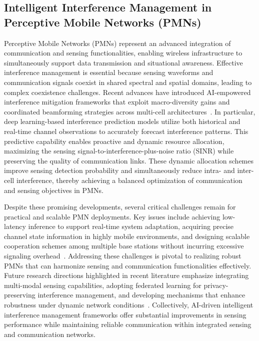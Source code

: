 \documentclass[sigconf]{acmart}
\begin{document}
\subsection{Intelligent Interference Management in Perceptive Mobile Networks (PMNs)}

Perceptive Mobile Networks (PMNs) represent an advanced integration of communication and sensing functionalities, enabling wireless infrastructure to simultaneously support data transmission and situational awareness. Effective interference management is essential because sensing waveforms and communication signals coexist in shared spectral and spatial domains, leading to complex coexistence challenges. Recent advances have introduced AI-empowered interference mitigation frameworks that exploit macro-diversity gains and coordinated beamforming strategies across multi-cell architectures~\cite{ref48}. In particular, deep learning-based interference prediction models utilize both historical and real-time channel observations to accurately forecast interference patterns. This predictive capability enables proactive and dynamic resource allocation, maximizing the sensing signal-to-interference-plus-noise ratio (SINR) while preserving the quality of communication links. These dynamic allocation schemes improve sensing detection probability and simultaneously reduce intra- and inter-cell interference, thereby achieving a balanced optimization of communication and sensing objectives in PMNs.

Despite these promising developments, several critical challenges remain for practical and scalable PMN deployments. Key issues include achieving low-latency inference to support real-time system adaptation, acquiring precise channel state information in highly mobile environments, and designing scalable cooperation schemes among multiple base stations without incurring excessive signaling overhead~\cite{ref48}. Addressing these challenges is pivotal to realizing robust PMNs that can harmonize sensing and communication functionalities effectively. Future research directions highlighted in recent literature emphasize integrating multi-modal sensing capabilities, adopting federated learning for privacy-preserving interference management, and developing mechanisms that enhance robustness under dynamic network conditions~\cite{ref48}. Collectively, AI-driven intelligent interference management frameworks offer substantial improvements in sensing performance while maintaining reliable communication within integrated sensing and communication networks.
\end{document}

